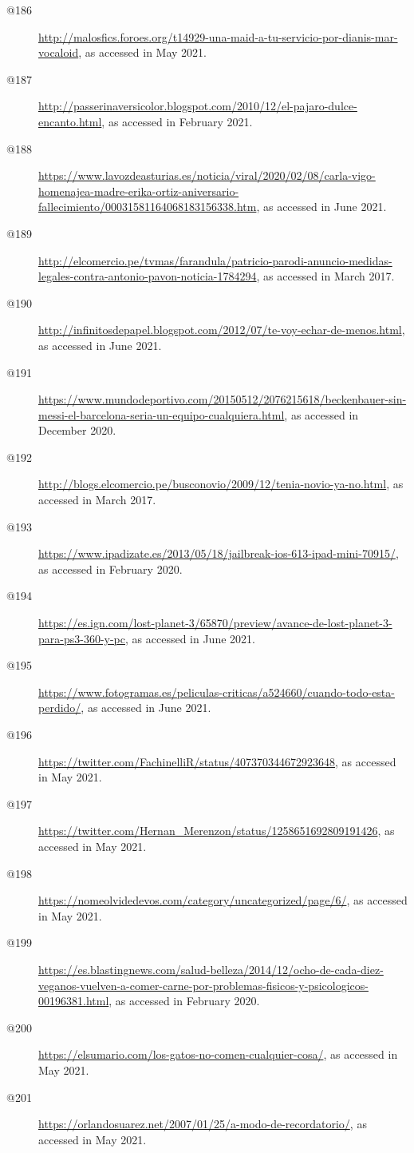 \begin{flushleft}
\begin{description}
\item[@186]\url{http://malosfics.foroes.org/t14929-una-maid-a-tu-servicio-por-dianis-mar-vocaloid}, as accessed in May 2021.
\item[@187]\url{http://passerinaversicolor.blogspot.com/2010/12/el-pajaro-dulce-encanto.html}, as accessed in February 2021.
\item[@188]\url{https://www.lavozdeasturias.es/noticia/viral/2020/02/08/carla-vigo-homenajea-madre-erika-ortiz-aniversario-fallecimiento/00031581164068183156338.htm}, as accessed in June 2021.
\item[@189]\url{http://elcomercio.pe/tvmas/farandula/patricio-parodi-anuncio-medidas-legales-contra-antonio-pavon-noticia-1784294}, as accessed in March 2017.
\item[@190]\url{http://infinitosdepapel.blogspot.com/2012/07/te-voy-echar-de-menos.html}, as accessed in June 2021.
\item[@191]\url{https://www.mundodeportivo.com/20150512/2076215618/beckenbauer-sin-messi-el-barcelona-seria-un-equipo-cualquiera.html}, as accessed in December 2020.
\item[@192]\url{http://blogs.elcomercio.pe/busconovio/2009/12/tenia-novio-ya-no.html}, as accessed in March 2017.
\item[@193]\url{https://www.ipadizate.es/2013/05/18/jailbreak-ios-613-ipad-mini-70915/}, as accessed in February 2020.
\item[@194]\url{https://es.ign.com/lost-planet-3/65870/preview/avance-de-lost-planet-3-para-ps3-360-y-pc}, as accessed in June 2021.
\item[@195]\url{https://www.fotogramas.es/peliculas-criticas/a524660/cuando-todo-esta-perdido/}, as accessed in June 2021.
\item[@196]\url{https://twitter.com/FachinelliR/status/407370344672923648}, as accessed in May 2021.
\item[@197]\url{https://twitter.com/Hernan_Merenzon/status/1258651692809191426}, as accessed in May 2021.
\item[@198]\url{https://nomeolvidedevos.com/category/uncategorized/page/6/}, as accessed in May 2021.
\item[@199]\url{https://es.blastingnews.com/salud-belleza/2014/12/ocho-de-cada-diez-veganos-vuelven-a-comer-carne-por-problemas-fisicos-y-psicologicos-00196381.html}, as accessed in February 2020.
\item[@200]\url{https://elsumario.com/los-gatos-no-comen-cualquier-cosa/}, as accessed in May 2021.
\item[@201]\url{https://orlandosuarez.net/2007/01/25/a-modo-de-recordatorio/}, as accessed in May 2021.

\end{description}
\end{flushleft}
